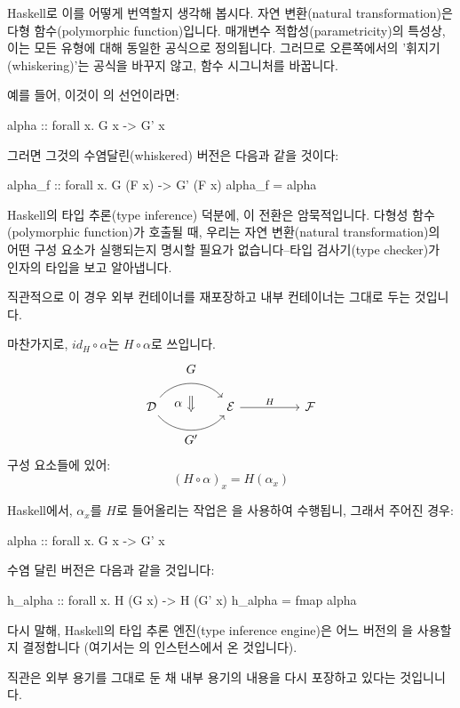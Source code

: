 \documentclass[DaoFP]{subfiles}
\begin{document}
Haskell로 이를 어떻게 번역할지 생각해 봅시다. 자연 변환(natural transformation)은 다형 함수(polymorphic function)입니다. 매개변수 적합성(parametricity)의 특성상, 이는 모든 유형에 대해 동일한 공식으로 정의됩니다. 그러므로 오른쪽에서의 '휘지기(whiskering)'는 공식을 바꾸지 않고, 함수 시그니처를 바꿉니다.

예를 들어, 이것이 의 선언이라면:
\begin{haskell}
alpha :: forall x. G x -> G' x
\end{haskell}
그러면 그것의 수염달린(whiskered) 버전은 다음과 같을 것이다:
\begin{haskell}
alpha_f :: forall x. G (F x) -> G' (F x)
alpha_f = alpha
\end{haskell}
Haskell의 타입 추론(type inference) 덕분에, 이 전환은 암묵적입니다. 다형성 함수(polymorphic function)가 호출될 때, 우리는 자연 변환(natural transformation)의 어떤 구성 요소가 실행되는지 명시할 필요가 없습니다--타입 검사기(type checker)가 인자의 타입을 보고 알아냅니다.

직관적으로 이 경우 외부 컨테이너를 재포장하고 내부 컨테이너는 그대로 두는 것입니다.

마찬가지로, $id_H \circ \alpha$는 $H \circ \alpha$로 쓰입니다.
\[
\begin{tikzcd}[column sep=huge]
\mathcal{D}
  \arrow[bend left=50]{r}[name=U, label=above:$G$]{}
  \arrow[bend right=50]{r}[name=D, label=below:$G'$]{} 
 &
\mathcal{E}
\arrow[r, "H"]
&
\mathcal{F}
  \arrow[shorten <=10pt,shorten >=10pt,Rightarrow,to path={(U) -- node[label=left:$\alpha$] {} (D)}]{}
\end{tikzcd}
\]
구성 요소들에 있어:
\[(H \circ \alpha)_x = H (\alpha_x) \]

Haskell에서, $\alpha_x$를 $H$로 들어올리는 작업은 을 사용하여 수행됩니, 그래서 주어진 경우:
\begin{haskell}
alpha :: forall x. G x -> G' x
\end{haskell}
수염 달린 버전은 다음과 같을 것입니다:
\begin{haskell}
h_alpha :: forall x. H (G x) -> H (G' x)
h_alpha = fmap alpha
\end{haskell}
다시 말해, Haskell의 타입 추론 엔진(type inference engine)은 어느 버전의 을 사용할지 결정합니다 (여기서는 의  인스턴스에서 온 것입니다).

직관은 외부 용기를 그대로 둔 채 내부 용기의 내용을 다시 포장하고 있다는 것입니니다.
\end{document}
